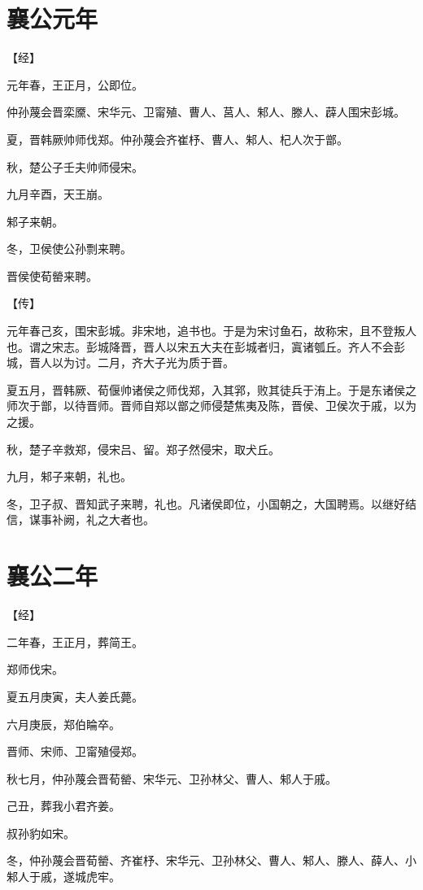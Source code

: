 \documentclass[a4paper,12pt,UTF8,twoside]{ctexbook}
\begin{document}
\chapter{襄公元年}



【经】

元年春，王正月，公即位。

仲孙蔑会晋栾黡、宋华元、卫甯殖、曹人、莒人、邾人、滕人、薜人围宋彭城。

夏，晋韩厥帅师伐郑。仲孙蔑会齐崔杼、曹人、邾人、杞人次于鄫。

秋，楚公子壬夫帅师侵宋。

九月辛酉，天王崩。

邾子来朝。

冬，卫侯使公孙剽来聘。

晋侯使荀罃来聘。

【传】

元年春己亥，围宋彭城。非宋地，追书也。于是为宋讨鱼石，故称宋，且不登叛人也。谓之宋志。彭城降晋，晋人以宋五大夫在彭城者归，寘诸瓠丘。齐人不会彭城，晋人以为讨。二月，齐大子光为质于晋。

夏五月，晋韩厥、荀偃帅诸侯之师伐郑，入其郛，败其徒兵于洧上。于是东诸侯之师次于鄫，以待晋师。晋师自郑以鄫之师侵楚焦夷及陈，晋侯、卫侯次于戚，以为之援。

秋，楚子辛救郑，侵宋吕、留。郑子然侵宋，取犬丘。

九月，邾子来朝，礼也。

冬，卫子叔、晋知武子来聘，礼也。凡诸侯即位，小国朝之，大国聘焉。以继好结信，谋事补阙，礼之大者也。


\chapter{襄公二年}



【经】

二年春，王正月，葬简王。

郑师伐宋。

夏五月庚寅，夫人姜氏薨。

六月庚辰，郑伯睔卒。

晋师、宋师、卫甯殖侵郑。

秋七月，仲孙蔑会晋荀罃、宋华元、卫孙林父、曹人、邾人于戚。

己丑，葬我小君齐姜。

叔孙豹如宋。

冬，仲孙蔑会晋荀罃、齐崔杼、宋华元、卫孙林父、曹人、邾人、滕人、薛人、小邾人于戚，遂城虎牢。
\end{document}
